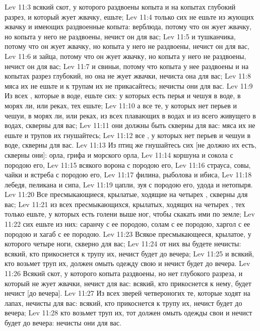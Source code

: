 \vs Lev 11:3 всякий скот, у которого раздвоены копыта и на копытах глубокий разрез, и который жует жвачку, ешьте;
\vs Lev 11:4 только сих не ешьте из жующих жвачку и имеющих раздвоенные копыта: верблюда, потому что он жует жвачку, но копыта у него не раздвоены, нечист он для вас;
\vs Lev 11:5 и тушканчика, потому что он жует жвачку, но копыта у него не раздвоены, нечист он для вас,
\vs Lev 11:6 и зайца, потому что он жует жвачку, но копыта у него не раздвоены, нечист он для вас;
\vs Lev 11:7 и свиньи, потому что копыта у нее раздвоены и на копытах разрез глубокий, но она не жует жвачки, нечиста она для вас;
\vs Lev 11:8 мяса их не ешьте и к трупам их не прикасайтесь; нечисты они для вас.
\vs Lev 11:9 Из всех , которые в воде, ешьте сих: у которых есть перья и чешуя в воде, в морях ли, или реках, тех ешьте;
\vs Lev 11:10 а все те, у которых нет перьев и чешуи, в морях ли, или реках, из всех плавающих в водах и из всего живущего в водах, скверны для вас;
\vs Lev 11:11 они должны быть скверны для вас: мяса их не ешьте и трупов их гнушайтесь;
\vs Lev 11:12 все , у которых нет перьев и чешуи в воде, скверны для вас.
\vs Lev 11:13 Из птиц же гнушайтесь сих [не должно их есть, скверны они]: орла, грифа и морского орла,
\vs Lev 11:14 коршуна и сокола с породою его,
\vs Lev 11:15 всякого ворона с породою его,
\vs Lev 11:16 страуса, совы, чайки и ястреба с породою его,
\vs Lev 11:17 филина, рыболова и ибиса,
\vs Lev 11:18 лебедя, пеликана и сипа,
\vs Lev 11:19 цапли, зуя с породою его, удода и нетопыря.
\vs Lev 11:20 Все  пресмыкающиеся, крылатые, ходящие на четырех , скверны для вас;
\vs Lev 11:21 из всех пресмыкающихся, крылатых, ходящих на четырех , тех только ешьте, у которых есть голени выше ног, чтобы скакать ими по земле;
\vs Lev 11:22 сих ешьте из них: саранчу с ее породою, солам с ее породою, харгол с ее породою и хагаб с ее породою.
\vs Lev 11:23 Всякое  пресмыкающееся, крылатое, у которого четыре ноги, скверно для вас;
\vs Lev 11:24 от них вы будете нечисты: всякий, кто прикоснется к трупу их, нечист будет до вечера;
\vs Lev 11:25 и всякий, кто возьмет труп их, должен омыть одежду свою и нечист будет до вечера.
\vs Lev 11:26 Всякий скот, у которого копыта раздвоены, но нет глубокого разреза, и который не жует жвачки, нечист для вас: всякий, кто прикоснется к нему, будет нечист [до вечера].
\vs Lev 11:27 Из всех зверей четвероногих те, которые ходят на лапах, нечисты для вас: всякий, кто прикоснется к трупу их, нечист будет до вечера;
\vs Lev 11:28 кто возьмет труп их, тот должен омыть одежды свои и нечист будет до вечера: нечисты они для вас.
